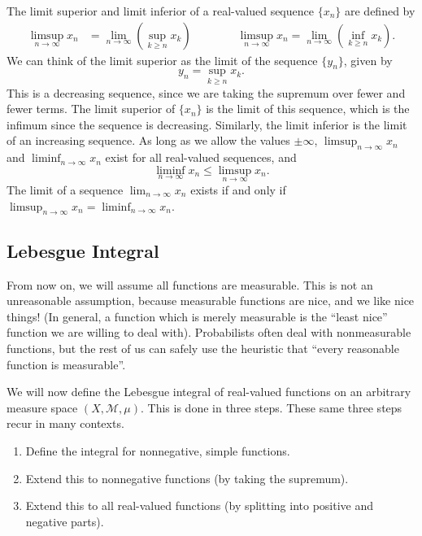 \documentclass[12pt]{amsart}         %
\theoremstyle{remark}
\begin{document}
The limit superior and limit inferior of a real-valued sequence $\{ x_n \}$ are defined by
\begin{align*}
\limsup_{n\rightarrow\infty} x_n &= \lim_{n \rightarrow \infty} \left( \sup_{k \geq n} x_k \right) \qquad\qquad
\limsup_{n\rightarrow\infty} x_n = \lim_{n \rightarrow \infty} \left( \inf_{k \geq n} x_k \right).
\end{align*}
We can think of the limit superior as the limit of the sequence $\{ y_n \} $, given by
\[
y_n = \sup_{k \geq n} x_k.
\]
This is a decreasing sequence, since we are taking the supremum over fewer and fewer terms. The limit superior of $\{x_n \}$ is the limit of this sequence, which is the infimum since the sequence is decreasing. Similarly, the limit inferior is the limit of an increasing sequence. As long as we allow the values $\pm \infty$, $\limsup_{n\rightarrow\infty} x_n$ and $\liminf_{n\rightarrow\infty} x_n$ exist for all real-valued sequences, and
\[
\liminf_{n\rightarrow\infty} x_n 
\leq \limsup_{n\rightarrow\infty} x_n.
\]
The limit of a sequence $\lim_{n \rightarrow \infty} x_n$ exists if and only if $\limsup_{n\rightarrow\infty} x_n = \liminf_{n\rightarrow\infty} x_n$.

\subsection{Lebesgue Integral}

From now on, we will assume all functions are measurable. This is not an unreasonable assumption, because measurable functions are nice, and we like nice things! (In general, a function which is merely measurable is the ``least nice'' function we are willing to deal with).
Probabilists often deal with nonmeasurable functions, but the rest of us can safely use the heuristic that ``every reasonable function is measurable''.

We will now define the Lebesgue integral of real-valued functions on an arbitrary measure space $(X, \mathcal{M}, \mu)$. This is done in three steps. These same three steps recur in many contexts.
\begin{enumerate}
    \item Define the integral for nonnegative, simple functions.
    \item Extend this to nonnegative functions (by taking the supremum).
    \item Extend this to all real-valued functions (by splitting into positive and negative parts).
\end{enumerate}
\end{document}
